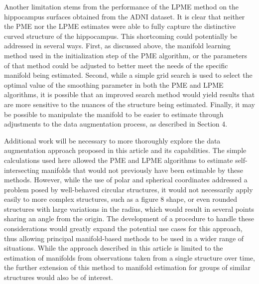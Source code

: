 \documentclass[11pt,reqno]{article}
\theoremstyle{definition}
\begin{document}
Another limitation stems from the performance of the LPME method on the hippocampus surfaces obtained from the ADNI dataset. It is clear that neither the PME nor the LPME estimates were able to fully capture the distinctive curved structure of the hippocampus. This shortcoming could potentially be addressed in several ways. First, as discussed above, the manifold learning method used in the initialization step of the PME algorithm, or the parameters of that method could be adjusted to better meet the needs of the specific manifold being estimated. Second, while a simple grid search is used to select the optimal value of the smoothing parameter in both the PME and LPME algorithms, it is possible that an improved search method would yield results that are more sensitive to the nuances of the structure being estimated. Finally, it may be possible to manipulate the manifold to be easier to estimate through adjustments to the data augmentation process, as described in Section 4. 

Additional work will be necessary to more thoroughly explore the data augmentation approach proposed in this article and its capabilities. The simple calculations used here allowed the PME and LPME algorithms to estimate self-intersecting manifolds that would not previously have been estimable by these methods. However, while the use of polar and spherical coordinates addressed a problem posed by well-behaved circular structures, it would not necessarily apply easily to more complex structures, such as a figure 8 shape, or even rounded structures with large variations in the radius, which would result in several points sharing an angle from the origin. The development of a procedure to handle these considerations would greatly expand the potential use cases for this approach, thus allowing principal manifold-based methods to be used in a wider range of situations. While the approach described in this article is limited to the estimation of manifolds from observations taken from a single structure over time, the further extension of this method to manifold estimation for groups of similar structures would also be of interest.

\newpage

\nocite{*}
%
%
\printbibliography
\end{document}
